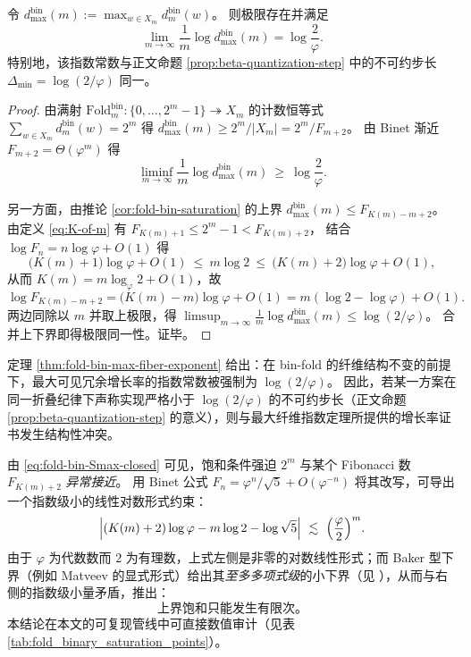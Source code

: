 \begin{theorem}\label{thm:fold-bin-max-fiber-exponent}
令 \(d^{\mathrm{bin}}_{\max}(m):=\max_{w\in X_m} d^{\mathrm{bin}}_m(w)\)。
则极限存在并满足
\[
\lim_{m\to\infty}\frac{1}{m}\log d^{\mathrm{bin}}_{\max}(m)=\log\frac{2}{\varphi}.
\]
特别地，该指数常数与正文命题 \ref{prop:beta-quantization-step} 中的不可约步长 \(\Delta_{\min}=\log(2/\varphi)\) 同一。
\end{theorem}
\begin{proof}
由满射 \(\mathrm{Fold}^{\mathrm{bin}}_m:\{0,\dots,2^m-1\}\twoheadrightarrow X_m\) 的计数恒等式
\(
\sum_{w\in X_m} d^{\mathrm{bin}}_m(w)=2^m
\)
得
\(
d^{\mathrm{bin}}_{\max}(m)\ge 2^m/|X_m|
=2^m/F_{m+2}
\)。
由 Binet 渐近 \(F_{m+2}=\Theta(\varphi^{m})\) 得
\[
\liminf_{m\to\infty}\frac{1}{m}\log d^{\mathrm{bin}}_{\max}(m)\ \ge\ \log\frac{2}{\varphi}.
\]
\par
另一方面，由推论 \ref{cor:fold-bin-saturation} 的上界
\(
d^{\mathrm{bin}}_{\max}(m)\le F_{K(m)-m+2}
\)。
由定义 \eqref{eq:K-of-m} 有
\(
F_{K(m)+1}\le 2^m-1 < F_{K(m)+2}
\)，
结合 \(\log F_n=n\log\varphi+O(1)\) 得
\[
\bigl(K(m)+1\bigr)\log\varphi+O(1)\ \le\ m\log 2\ \le\ \bigl(K(m)+2\bigr)\log\varphi+O(1),
\]
从而 \(K(m)=m\log_{\varphi}2+O(1)\)，故
\[
\log F_{K(m)-m+2}=\bigl(K(m)-m\bigr)\log\varphi+O(1)
=m(\log 2-\log\varphi)+O(1).
\]
两边同除以 \(m\) 并取上极限，得
\(
\limsup_{m\to\infty}\frac{1}{m}\log d^{\mathrm{bin}}_{\max}(m)\le \log(2/\varphi)
\)。
合并上下界即得极限同一性。证毕。
\end{proof}

\begin{remark}[不可约步长常数的硬约束]\label{rem:fold-bin-delta-min-hard-constraint}
定理 \ref{thm:fold-bin-max-fiber-exponent} 给出：在 bin-fold 的纤维结构不变的前提下，最大可见冗余增长率的指数常数被强制为 \(\log(2/\varphi)\)。
因此，若某一方案在同一折叠纪律下声称实现严格小于 \(\log(2/\varphi)\) 的不可约步长（正文命题 \ref{prop:beta-quantization-step} 的意义），则与最大纤维指数定理所提供的增长率证书发生结构性冲突。
\end{remark}

\begin{remark}\label{rem:fold-bin-finite}
由 \eqref{eq:fold-bin-Smax-closed} 可见，饱和条件强迫 \(2^m\) 与某个 Fibonacci 数 \(F_{K(m)+2}\) \emph{异常接近}。
用 Binet 公式 \(F_n=\varphi^n/\sqrt5+O(\varphi^{-n})\) 将其改写，可导出一个指数级小的线性对数形式约束：
\[
\Bigl|(K(m)+2)\log\varphi - m\log 2 - \log\sqrt5\Bigr|
\ \lesssim\ \Bigl(\frac{\varphi}{2}\Bigr)^m.
\]
由于 \(\varphi\) 为代数数而 \(2\) 为有理数，上式左侧是非零的对数线性形式；而 Baker 型下界（例如 Matveev 的显式形式）给出其\emph{至多多项式级}的小下界（见 \cite{Matveev2000LinearFormsLogs,BakerWustholz2007LogarithmicForms}），从而与右侧的指数级小量矛盾，推出：
\[
\text{上界饱和只能发生有限次。}
\]
本结论在本文的可复现管线中可直接数值审计（见表 \ref{tab:fold_binary_saturation_points}）。
\end{remark}

